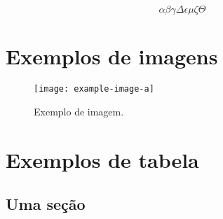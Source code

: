\documentclass[
	12pt,				%
	openright,			%
	twoside,			%
	b5paper,			%
	english,			%
	french,				%
	brazil,				%
	sumario=tradicional
]{abntex2}
\begin{document}
\[
\alpha \beta \gamma \Delta \epsilon \mu \zeta \Theta
\]

\lipsum[1-10]

\chapter{Exemplos de imagens}

\lipsum[1]

\begin{figure}
\centering
\texttt{[image: example-image-a]}
\caption{Exemplo de imagem.}
\label{fig:exemplo}
\end{figure}

\lipsum[6]





\lipsum[7]

\chapter{Exemplos de tabela}

\section{Uma seção}

\lipsum[8]
\end{document}
